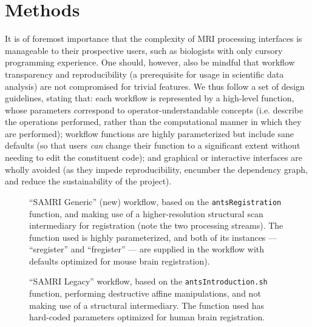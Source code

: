 \section{Methods}
It is of foremost importance that the complexity of MRI processing interfaces is manageable to their prospective users, such as biologists with only cursory programming experience.
One should, however, also be mindful that workflow transparency and reproducibility (a prerequisite for usage in scientific data analysis) are not compromised for trivial features.
We thus follow  a set of design guidelines, stating that:
each workflow is represented by a high-level function, whose parameters correspond to operator-understandable concepts (i.e. describe the operations performed, rather than the computational manner in which they are performed); 
workflow functions are highly parameterized but include sane defaults (so that users \textit{can} change their function to a significant extent without needing to edit the constituent code);
and graphical or interactive interfaces are wholly avoided (as they impede reproducibility, encumber the dependency graph, and reduce the sustainability of the project).

\begin{figure*}[h!]
	\begin{subfigure}{.66\textwidth}
		\centering
		\vspace{.55em}
		\caption{
			“SAMRI Generic” (new) workflow, based on the \textcolor{mg}{\texttt{antsRegistration}} function, and  making use of a higher-resolution structural scan intermediary for registration (note the two processing streams).
			The function used is highly parameterized, and both of its instances --- “s\niceus register” and “f\niceus register” --- are supplied in the workflow with defaults optimized for mouse brain registration).
			}
		\label{fig:wfgg}
	\end{subfigure}\hfill
	\begin{subfigure}{.31\textwidth}
		\centering
		\caption{
			“SAMRI Legacy” workflow, based on the \textcolor{mg}{\texttt{antsIntroduction.sh}} function, performing destructive affine manipulations, and not making use of a structural intermediary.
			The function used has hard-coded parameters optimized for human brain registration.
			}
		\label{fig:wfgl}
	\end{subfigure}
	\caption{
		Directed acyclic graphs depicting the two alternate MRI registration workflows and their constituent processing steps.
		The package correspondence of each processing node is appended in parantheses to the node name.
		The “utility” indication corresponds to nodes based on Python functions specific to the workflow, distributed alongside it, and dynamically wrapped via Nipype.
		The “extra\niceus interfaces” indication corresponds to nodes using explicitly defined Nipype-style interfaces, which are specific to the workflow and distributed alongside it.
		}
	\label{fig:wfg}
\end{figure*}

